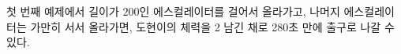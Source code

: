 첫 번째 예제에서 길이가 $200$인 에스컬레이터를 걸어서 올라가고, 나머지 에스컬레이터는 가만히 서서 올라가면, 도현이의 체력을 2 남긴 채로 280초 만에 출구로 나갈 수 있다.